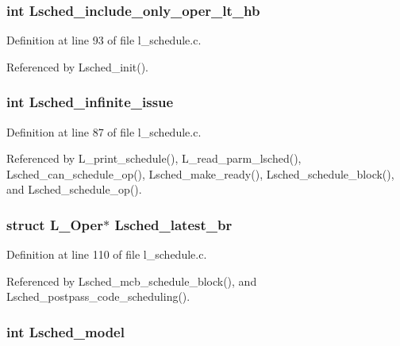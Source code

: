 \subsubsection{\setlength{\rightskip}{0pt plus 5cm}int \bf{Lsched\_\-include\_\-only\_\-oper\_\-lt\_\-hb}}\label{l__schedule_8h_20a06bed1bdca8cd03cffb1cbe5b588b}




Definition at line 93 of file l\_\-schedule.c.

Referenced by Lsched\_\-init().
\subsubsection{\setlength{\rightskip}{0pt plus 5cm}int \bf{Lsched\_\-infinite\_\-issue}}\label{l__schedule_8h_a41d94228aa003482c3c8da8841c420f}




Definition at line 87 of file l\_\-schedule.c.

Referenced by L\_\-print\_\-schedule(), L\_\-read\_\-parm\_\-lsched(), Lsched\_\-can\_\-schedule\_\-op(), Lsched\_\-make\_\-ready(), Lsched\_\-schedule\_\-block(), and Lsched\_\-schedule\_\-op().
\subsubsection{\setlength{\rightskip}{0pt plus 5cm}struct L\_\-Oper$\ast$ \bf{Lsched\_\-latest\_\-br}}\label{l__schedule_8h_bf5ac60970385f7d1582ea7d94884faa}




Definition at line 110 of file l\_\-schedule.c.

Referenced by Lsched\_\-mcb\_\-schedule\_\-block(), and Lsched\_\-postpass\_\-code\_\-scheduling().
\subsubsection{\setlength{\rightskip}{0pt plus 5cm}int \bf{Lsched\_\-model}}\label{l__schedule_8h_b7d554b62471e5d19028965e1c2ccc30}


